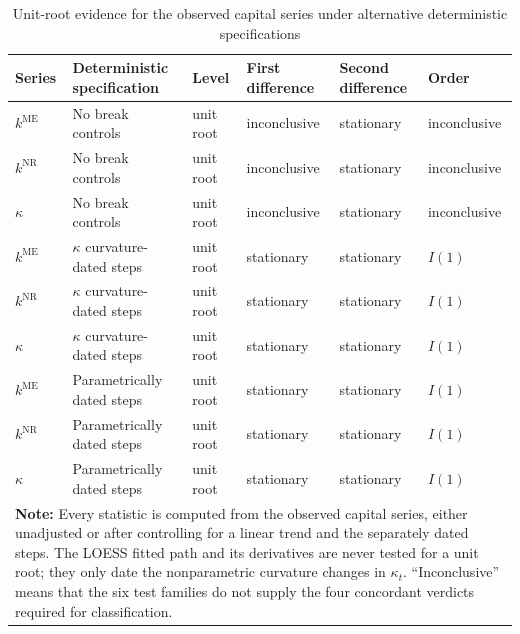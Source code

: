 \begin{table}[h!]
\centering\small
\caption{Unit-root evidence for the observed capital series under alternative deterministic specifications}
\label{tab:orders}
\begin{tabular}{p{1.1cm}p{2.7cm}p{1.6cm}p{2.0cm}p{2.0cm}p{1.9cm}}
\toprule
\textbf{Series} & \textbf{Deterministic specification} & \textbf{Level} & \textbf{First difference} & \textbf{Second difference} & \textbf{Order}\\
\midrule
$k^{\mathrm{ME}}$ & No break controls & unit root & inconclusive & stationary & inconclusive \\
$k^{\mathrm{NR}}$ & No break controls & unit root & inconclusive & stationary & inconclusive \\
$\kappa$ & No break controls & unit root & inconclusive & stationary & inconclusive \\
$k^{\mathrm{ME}}$ & $\kappa$ curvature-dated steps & unit root & stationary & stationary & $I(1)$ \\
$k^{\mathrm{NR}}$ & $\kappa$ curvature-dated steps & unit root & stationary & stationary & $I(1)$ \\
$\kappa$ & $\kappa$ curvature-dated steps & unit root & stationary & stationary & $I(1)$ \\
$k^{\mathrm{ME}}$ & Parametrically dated steps & unit root & stationary & stationary & $I(1)$ \\
$k^{\mathrm{NR}}$ & Parametrically dated steps & unit root & stationary & stationary & $I(1)$ \\
$\kappa$ & Parametrically dated steps & unit root & stationary & stationary & $I(1)$ \\
\bottomrule
\multicolumn{6}{p{13.1cm}}{\footnotesize \textbf{Note:} Every statistic is computed from the observed capital series, either unadjusted or after controlling for a linear trend and the separately dated steps. The LOESS fitted path and its derivatives are never tested for a unit root; they only date the nonparametric curvature changes in $\kappa_t$. ``Inconclusive'' means that the six test families do not supply the four concordant verdicts required for classification.}
\end{tabular}
\end{table}
